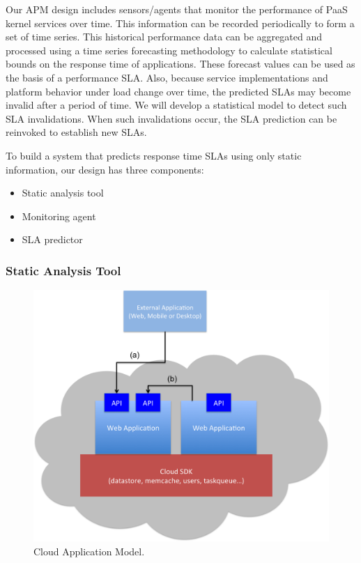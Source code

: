 \documentclass[11pt]{article}
\begin{document}
Our APM design includes sensors/agents that monitor the performance of PaaS kernel services over time. This
information can be recorded periodically to form a set of time series. This historical performance data can be
aggregated and processed using a time series forecasting methodology to calculate statistical bounds on the
response time of applications. These forecast values can be used as the basis of
a performance SLA.
Also, because service implementations and platform behavior under load change over time,
the predicted SLAs may become invalid after a period of time. We will develop a statistical model to detect such SLA invalidations.
When such invalidations occur, the SLA prediction can be reinvoked to establish new SLAs.

To build a system that predicts response time SLAs using only static information, our design has three components:
\begin{itemize}
\item Static analysis tool
\item Monitoring agent
\item SLA predictor
\end{itemize}

\subsubsection{Static Analysis Tool}
\begin{figure}
\centering
\includegraphics[scale=0.4]{cloud_app_model}
\caption{Cloud Application Model.}
\label{fig:cloud_app_model}
\end{figure}
\end{document}
